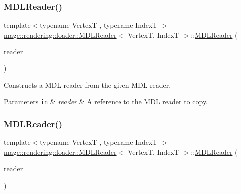 \subsubsection{\texorpdfstring{M\+D\+L\+Reader()}{MDLReader()}\hspace{0.1cm}{\footnotesize\ttfamily [2/3]}}
{\footnotesize\ttfamily template$<$typename VertexT , typename IndexT $>$ \\
\mbox{\hyperlink{classmage_1_1rendering_1_1loader_1_1_m_d_l_reader}{mage\+::rendering\+::loader\+::\+M\+D\+L\+Reader}}$<$ VertexT, IndexT $>$\+::\mbox{\hyperlink{classmage_1_1rendering_1_1loader_1_1_m_d_l_reader}{M\+D\+L\+Reader}} (\begin{DoxyParamCaption}\item[{const \mbox{\hyperlink{classmage_1_1rendering_1_1loader_1_1_m_d_l_reader}{M\+D\+L\+Reader}}$<$ VertexT, IndexT $>$ \&}]{reader }\end{DoxyParamCaption})\hspace{0.3cm}{\ttfamily [delete]}}

Constructs a M\+DL reader from the given M\+DL reader.


\begin{DoxyParams}[1]{Parameters}
\mbox{\tt in}  & {\em reader} & A reference to the M\+DL reader to copy. \\
\hline
\end{DoxyParams}
\mbox{\label{classmage_1_1rendering_1_1loader_1_1_m_d_l_reader_a77f5be43642636faf71e7fb3eed7e050}} 
\subsubsection{\texorpdfstring{M\+D\+L\+Reader()}{MDLReader()}\hspace{0.1cm}{\footnotesize\ttfamily [3/3]}}
{\footnotesize\ttfamily template$<$typename VertexT , typename IndexT $>$ \\
\mbox{\hyperlink{classmage_1_1rendering_1_1loader_1_1_m_d_l_reader}{mage\+::rendering\+::loader\+::\+M\+D\+L\+Reader}}$<$ VertexT, IndexT $>$\+::\mbox{\hyperlink{classmage_1_1rendering_1_1loader_1_1_m_d_l_reader}{M\+D\+L\+Reader}} (\begin{DoxyParamCaption}\item[{\mbox{\hyperlink{classmage_1_1rendering_1_1loader_1_1_m_d_l_reader}{M\+D\+L\+Reader}}$<$ VertexT, IndexT $>$ \&\&}]{reader }\end{DoxyParamCaption})\hspace{0.3cm}{\ttfamily [noexcept]}}

